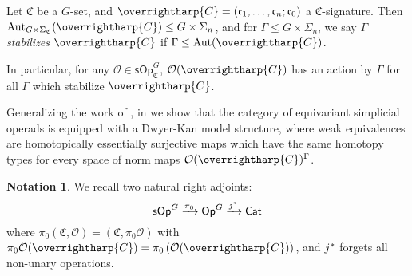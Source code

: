 \documentclass[a4paper,10pt
,draft
]{article}%
\numberwithin{equation}{section}
\numberwithin{figure}{section}
\theoremstyle{definition} %
\newtheorem{notation}[equation]{Notation}%
\newcommand{\vect}[1]{\text{\overrightharp{\ensuremath{#1}}}}
\newcommand{\sSet}{\ensuremath{\mathsf{sSet}}}%
\newcommand{\Cat}{\mathsf{Cat}}
\newcommand{\Op}{\mathsf{Op}}%
\newcommand{\sOp}{\ensuremath{\mathsf{sOp}}}%
\newcommand{\sSym}{\ensuremath{\mathsf{sSym}}}%
\DeclareMathOperator{\Aut}{Aut}%
\renewcommand{\O}{\ensuremath{\mathcal O}}
\newcommand{\1}{\ensuremath{\mathbbm 1}}%
\begin{document}
Let $\mathfrak C$ be a $G$-set, and $\vect C = (\mathfrak c_1, \dots, \mathfrak c_n; \mathfrak c_0)$ a $\mathfrak C$-signature.
Then $\Aut_{G \ltimes \Sigma_{\mathfrak C}}(\vect C) \leq G \times \Sigma_n$,
and for $\Gamma \leq G \times \Sigma_n$, we say \textit{$\Gamma$ stabilizes $\vect C$} if $\Gamma \leq \Aut(\vect C)$.

In particular, for any $\O \in \sOp^G_{\mathfrak C}$,
$\O(\vect C)$ has an action by $\Gamma$ for all $\Gamma$ which stabilize $\vect C$.


Generalizing the work of \cite{Ber07b,CM13b}, in \cite{BP_HGOP} we show that
the category of equivariant simplicial operads is equipped with a Dwyer-Kan model structure,
where weak equivalences are homotopically essentially surjective maps which have the same homotopy types for every space of norm maps $\O(\vect C)^\Gamma$.


\begin{notation}
      We recall two natural right adjoints:
      \[
            \sOp^G \xrightarrow{\pi_0}
            \Op^G \xrightarrow{j^{\**}}
            \Cat
      \]
      where $\pi_0(\mathfrak C, \O) = (\mathfrak C, \pi_0 \O)$ with $\pi_0\O(\vect C) = \pi_0\left(\O(\vect C)\right)$,
      and $j^{\**}$ forgets all non-unary operations.
\end{notation}
\end{document}
